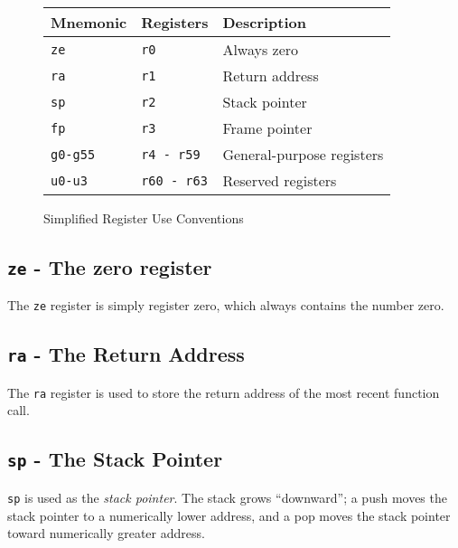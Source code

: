 \begin{figure}
\caption{\label{simple-conventions-fig} Simplified Register Use Conventions}

\begin{center}
\begin{tabular}{|l|l|p{2.0in}|}

\hline
	{\bf Mnemonic}	& {\bf Registers} & {\bf Description} \\
\hline
\index{ze - the zero register}
	{\tt ze}	& {\tt r0}		& Always zero \\
\hline
\index{ra - the return address}
	{\tt ra}	& {\tt r1}		& Return address \\
\hline
\index{sp - the stack pointer}
	{\tt sp}	& {\tt r2}		& Stack pointer \\
\hline
\index{fp - the frame pointer}
	{\tt fp}	& {\tt r3}		& Frame pointer \\
\hline
	{\tt g0-g55}	& {\tt r4 - r59}	& General-purpose registers \\
\hline
\index{u0-u3 - scratch registers}
	{\tt u0-u3}	& {\tt r60 - r63}	& Reserved registers \\
\hline

\end{tabular}
\end{center}

\end{figure}

\subsection{{\tt ze} - The zero register}

	The {\tt ze} register is simply register zero, which always
	contains the number zero.

\subsection{{\tt ra} - The Return Address}

	The {\tt ra} register is used to store the return address of
	the most recent function call.

\subsection{{\tt sp} - The Stack Pointer}

	{\tt sp} is used as the {\em stack pointer}.  The stack grows
	``downward''; a push moves the stack pointer to a numerically
	lower address, and a pop moves the stack pointer toward
	numerically greater address.

